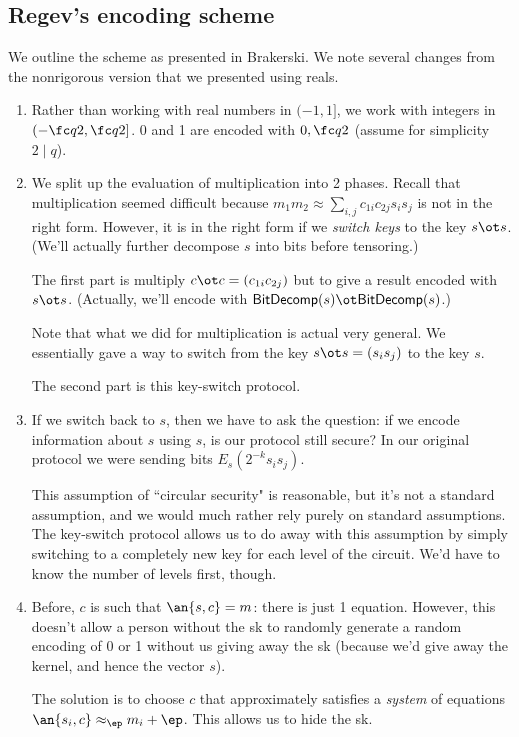 \subsection{Regev's encoding scheme}\label{sec:regev}
We outline the scheme as presented in Brakerski. We note several changes from the nonrigorous version that we presented using reals.
\begin{enumerate}
\item
Rather than working with real numbers in $(-1,1]$, we work with integers in $(-\fc q2,\fc q2]$. 0 and 1 are encoded with $0,\fc q2$ (assume for simplicity $2\mid q$).
\item
We split up the evaluation of multiplication into 2 phases. Recall that multiplication seemed difficult because $m_1m_2\approx \sum_{i,j} c_{1i}c_{2j} s_is_j$ is not in the right form. However, it is in the right form if we {\it switch keys} to the key $s\ot s$. (We'll actually further decompose $s$ into bits before tensoring.)

The first part is multiply $c\ot c=(c_{1i}c_{2j})$ but to give a result encoded with $s\ot s$. (Actually, we'll encode with $\mathsf{BitDecomp}(s)\ot \mathsf{BitDecomp}(s)$.)

Note that what we did for multiplication is actual very general. We essentially gave a way to switch from the key $s\ot s=(s_is_j)$ to the key $s$. 

The second part is this key-switch protocol.
\item
If we switch back to $s$, then we have to ask the question: if we encode information about $s$ using $s$, is our protocol still secure? In our original protocol we were sending bits $E_{s}(2^{-k}s_is_j)$.

This assumption of ``circular security" is reasonable, but it's not a standard assumption, and we would much rather rely purely on standard assumptions. The key-switch protocol allows us to do away with this assumption by simply switching to a completely new key for each level of the circuit. We'd have to know the number of levels first, though.
\item
Before, $c$ is such that $\an{s,c}=m$: there is just 1 equation. However, this doesn't allow a person without the sk to randomly generate a random encoding of 0 or 1 without us giving away the sk (because we'd give away the kernel, and hence the vector $s$).

The solution is to choose $c$ that approximately satisfies a {\it system} of equations $\an{s_i,c}\approx_\ep m_i+\ep$. This allows us to hide the sk.
\end{enumerate}

